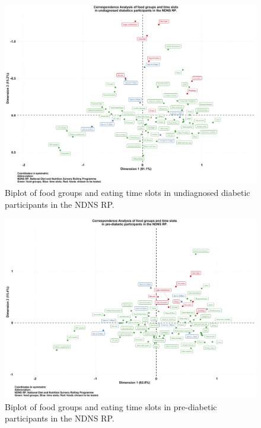 \documentclass[utf8]{frontiersSCNS}
\providecommand{\DIFaddbeginFL}{} %
\providecommand{\DIFaddendFL}{} %
\providecommand{\DIFdelbeginFL}{} %
\providecommand{\DIFdelendFL}{} %
\newcommand{\DIFscaledelfig}{0.5}
\newlength{\DIFdelgraphicswidth} %
\newlength{\DIFdelgraphicsheight} %
\newcommand{\DIFaddincludegraphics}[2][]{{\color{blue}\fbox{\DIFOincludegraphics[#1]{#2}}}} %
\newcommand{\DIFdelincludegraphics}[2][]{%
\sbox{\DIFdelgraphicsbox}{\DIFOincludegraphics[#1]{#2}}%
\settoboxwidth{\DIFdelgraphicswidth}{\DIFdelgraphicsbox} %
\settoboxtotalheight{\DIFdelgraphicsheight}{\DIFdelgraphicsbox} %
\scalebox{\DIFscaledelfig}{%
\parbox[b]{\DIFdelgraphicswidth}{\usebox{\DIFdelgraphicsbox}\\[-\baselineskip] \rule{\DIFdelgraphicswidth}{0em}}\llap{\resizebox{\DIFdelgraphicswidth}{\DIFdelgraphicsheight}{%
\setlength{\unitlength}{\DIFdelgraphicswidth}%
\begin{picture}(1,1)%
\thicklines\linethickness{2pt} %
{\color[rgb]{1,0,0}\put(0,0){\framebox(1,1){}}}%
{\color[rgb]{1,0,0}\put(0,0){\line( 1,1){1}}}%
{\color[rgb]{1,0,0}\put(0,1){\line(1,-1){1}}}%
\end{picture}%
}\hspace*{3pt}}} %
} %
\DeclareRobustCommand{\DIFaddbeginFL}{\DIFOaddbeginFL \let\includegraphics\DIFaddincludegraphics} %
\DeclareRobustCommand{\DIFaddendFL}{\DIFOaddendFL \let\includegraphics\DIFOincludegraphics} %
\DeclareRobustCommand{\DIFdelbeginFL}{\DIFOdelbeginFL \let\includegraphics\DIFdelincludegraphics} %
\DeclareRobustCommand{\DIFdelendFL}{\DIFOaddendFL \let\includegraphics\DIFOincludegraphics} %
\begin{document}
\begin{landscape}
\begin{figure}[!ht]
\begin{center}
\DIFdelbeginFL %
\DIFdelendFL \DIFaddbeginFL \includegraphics[width=21.5cm]{Fig4_big.jpg}
\DIFaddendFL \end{center}
\caption{Biplot of food groups and eating time slots in undiagnosed diabetic participants in the NDNS RP.}\label{fig:fig4}
\end{figure}

\begin{figure}[!ht]
\begin{center}
\DIFdelbeginFL %
\DIFdelendFL \DIFaddbeginFL \includegraphics[width=21.5cm]{Fig5_big.jpg}
\DIFaddendFL \end{center}
\caption{Biplot of food groups and eating time slots in pre-diabetic participants in the NDNS RP.}\label{fig:fig5}
\end{figure}

\end{landscape}
\end{document}
